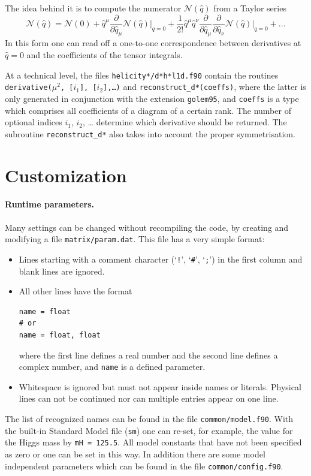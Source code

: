 The idea behind it is to compute the numerator $\mathcal{N}(\hat{q})$ 
from a Taylor series
\begin{equation}
\mathcal{N}(\hat{q})=\mathcal{N}(0)
+ \hat{q}^\mu
  \frac{\partial}{\partial\hat{q}_\mu}\mathcal{N}(\hat{q})\vert_{q=0}
+ \frac1{2!}\hat{q}^\mu\hat{q}^\nu
  \frac{\partial}{\partial\hat{q}_\mu}
  \frac{\partial}{\partial\hat{q}_\nu}
  \mathcal{N}(\hat{q})\vert_{q=0} + \ldots
\end{equation}
In this form one can read off a one-to-one correspondence between derivatives at
$\hat{q}=0$ and the coefficients of the tensor integrals.

At a technical level, 
the files \texttt{helicity*/d*h*l1d.f90} contain the routines
\texttt{derivative($\mu^2$, [$i_1$], [$i_2$],\dots)} and
\texttt{reconstruct\_d*(coeffs)}, where the latter is only generated in
conjunction with the extension \texttt{golem95}, and \texttt{coeffs} is
a type which comprises all coefficients of a diagram of a certain rank.
The number of optional indices $i_1$, $i_2$, \dots 
determine which derivative should be returned. The subroutine
\texttt{reconstruct\_d*} also takes into account the proper symmetrisation.

\section{Customization}\label{sec:Customization}
\paragraph{Runtime parameters.}
Many settings can be changed without recompiling the code, by
creating and modifying a file \texttt{matrix/param.dat}.
This file has a very simple format:
\begin{itemize}
\item Lines starting with a comment character (`\texttt{!}', `\texttt{\#}', `\texttt{;}')
      in the first column and blank lines are ignored.
\item All other lines have the format
\begin{lstlisting}[style=in]
name = float
# or
name = float, float
\end{lstlisting}
      where the first line defines a real number and the second
      line defines a complex number, and \texttt{name} is a defined
      parameter.
\item Whitespace is ignored but must not appear inside names or
      literals. Physical lines can not be continued nor can
      multiple entries appear on one line.
\end{itemize}
The list of recognized names can be found in the file
\texttt{common/model.f90}. 
With the built-in Standard Model file (\texttt{sm}) one
can re-set, for example, the value for the Higgs mass by 
\texttt{mH = 125.5}.
All model constants that have not been specified as zero or one
can be set in this way. 
In addition there are some model independent parameters which can be found in the file 
\texttt{common/config.f90}.

